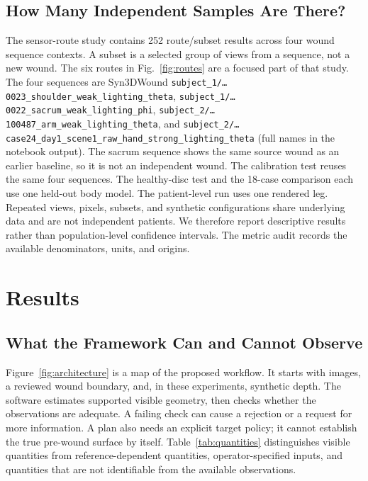 \documentclass[conference]{IEEEtran}
\begin{document}
\subsection{How Many Independent Samples Are There?}

The sensor-route study contains 252 route/subset results across four wound
sequence contexts. A subset is a selected group of views from a sequence,
not a new wound. The six routes in Fig.~\ref{fig:routes} are a focused part
of that study. The four sequences are Syn3DWound
\texttt{subject\_1/\ldots0023\_shoulder\_\allowbreak weak\_lighting\_theta},
\texttt{subject\_1/\ldots0022\_sacrum\_\allowbreak weak\_lighting\_phi},
\texttt{subject\_2/\ldots100487\_arm\_\allowbreak weak\_lighting\_theta}, and
\texttt{subject\_2/\ldots case24\_day1\_scene1\_raw\_hand\_\allowbreak strong\_lighting\_theta}
(full names in the notebook output). The sacrum sequence shows the same
source wound as an earlier baseline, so it is not an independent wound. The
calibration test reuses the same four sequences. The healthy-disc test and the 18-case
comparison each use one held-out body model. The patient-level run uses one
rendered leg. Repeated views, pixels, subsets, and synthetic configurations
share underlying data and are not independent patients. We therefore report
descriptive results rather than population-level confidence intervals.
The metric audit records the available denominators, units, and origins.

\section{Results}

\subsection{What the Framework Can and Cannot Observe}

Figure~\ref{fig:architecture} is a map of the proposed workflow. It starts
with images, a reviewed wound boundary, and, in these experiments, synthetic
depth. The software estimates supported visible geometry, then checks
whether the observations are adequate. A failing check can cause a
rejection or a request for more information. A plan also needs an explicit
target policy; it cannot establish the true pre-wound surface by itself.
Table~\ref{tab:quantities} distinguishes visible quantities from
reference-dependent quantities, operator-specified inputs, and quantities
that are not identifiable from the available observations.
\end{document}
